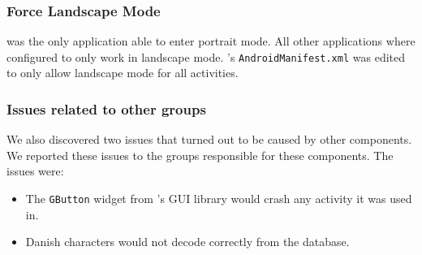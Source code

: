 \subsubsection*{Force Landscape Mode}
\launcher was the only application able to enter portrait mode. 
All other \giraf applications where configured to only work in landscape mode.
\launcher's \lstinline{AndroidManifest.xml} was edited to only allow landscape mode for all activities.

\subsubsection*{Issues related to other groups}
We also discovered two issues that turned out to be caused by other \giraf components. We reported these issues to the groups responsible for these components. The issues were:

\begin{itemize}
\item The \lstinline{GButton} widget from \giraf's GUI library would crash any activity it was used in.
\item Danish characters would not decode correctly from the database.
\end{itemize}
